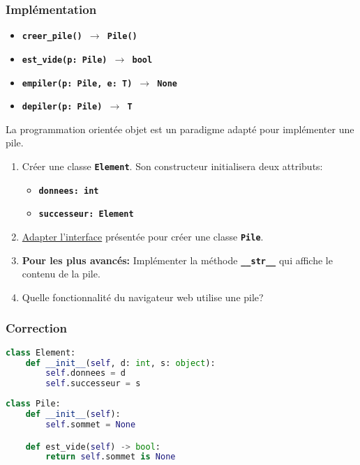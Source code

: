 \documentclass[svgnames,11pt]{beamer}
\begin{document}
\begin{frame}
    \frametitle{Implémentation}
    \begin{itemize}
        \item \texttt{\textbf{creer\_pile() $\rightarrow$ Pile()}}
        \item \texttt{\textbf{est\_vide(p: Pile) $\rightarrow$ bool}}
        \item \texttt{\textbf{empiler(p: Pile, e: T) $\rightarrow$ None}}
        \item \texttt{\textbf{depiler(p: Pile) $\rightarrow$ T}}
    \end{itemize}

    \begin{activite}
        La programmation orientée objet est un paradigme adapté pour implémenter une pile.
        \begin{enumerate}
            \item Créer une classe \textbf{\texttt{Element}}. Son constructeur initialisera deux attributs:
                  \begin{itemize}
                      \item \textbf{\texttt{donnees: int}}
                      \item \textbf{\texttt{successeur: Element}}
                  \end{itemize}
            \item \underline{Adapter l'interface} présentée pour créer une classe \textbf{\texttt{Pile}}.
            \item \textbf{Pour les plus avancés:} Implémenter la méthode \textbf{\texttt{\_\_str\_\_}} qui affiche le contenu de la pile.
            \item Quelle fonctionnalité du navigateur web utilise une pile?
        \end{enumerate}
    \end{activite}

\end{frame}
\begin{frame}[fragile]
    \frametitle{Correction}

    \begin{lstlisting}[language=Python , basicstyle=\ttfamily\small, xleftmargin=2em, xrightmargin=2em]
class Element:
    def __init__(self, d: int, s: object):
        self.donnees = d
        self.successeur = s
\end{lstlisting}
\end{frame}
\begin{frame}[fragile]

    \begin{lstlisting}[language=Python , basicstyle=\ttfamily\small, xleftmargin=2em, xrightmargin=2em]
class Pile:
    def __init__(self):
        self.sommet = None

    def est_vide(self) -> bool:
        return self.sommet is None
\end{lstlisting}
\end{frame}
\end{document}

